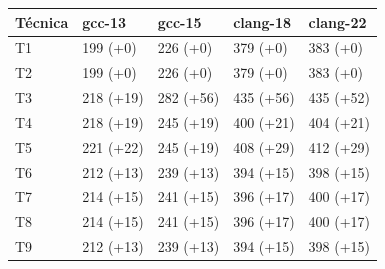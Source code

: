 \begin{tabular}{@{}lllll@{}}
\toprule
Técnica & gcc-13 & gcc-15 & clang-18 & clang-22 \\
\midrule
T1 & 199 (+0) & 226 (+0) & 379 (+0) & 383 (+0) \\
T2 & 199 (+0) & 226 (+0) & 379 (+0) & 383 (+0) \\
T3 & 218 (+19) & 282 (+56) & 435 (+56) & 435 (+52) \\
T4 & 218 (+19) & 245 (+19) & 400 (+21) & 404 (+21) \\
T5 & 221 (+22) & 245 (+19) & 408 (+29) & 412 (+29) \\
T6 & 212 (+13) & 239 (+13) & 394 (+15) & 398 (+15) \\
T7 & 214 (+15) & 241 (+15) & 396 (+17) & 400 (+17) \\
T8 & 214 (+15) & 241 (+15) & 396 (+17) & 400 (+17) \\
T9 & 212 (+13) & 239 (+13) & 394 (+15) & 398 (+15) \\
\bottomrule
\end{tabular}
